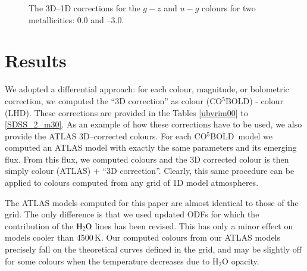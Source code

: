 \documentclass[]{aa}
\newcommand{\cobold}{{\sf CO$^5$BOLD}}
\renewcommand{\lhd}{{\sf LHD}}
\begin{document}
\begin{figure*}
\centering
{}
\caption{
The 3D--1D  corrections for  the $g-z$ and $u-g$ colours for
two metallicities: 0.0 and --3.0.
\label{coldiff}}

\end{figure*}


\section{Results}

We adopted a differential approach: for each colour, magnitude, or
bolometric correction, we computed the ``3D correction'' as
colour (\cobold ) - colour (\lhd ). These corrections
are provided in the Tables \ref{ubvrim00} to  \ref{SDSS_2_m30}. 
As an example of how these corrections have to be used, we also provide
the ATLAS  3D--corrected colours. 
For each \cobold\ model we computed an ATLAS model
with exactly the same parameters and its emerging flux. 
From this flux, we computed colours and  the 3D corrected colour
is then simply colour (ATLAS) + ``3D correction''.
Clearly, this same procedure can be applied to colours
computed from any grid of 1D model atmospheres.

The ATLAS models computed for this paper are almost identical
to those of the \citet{CK03} grid. The only difference is that 
we used updated ODFs for which the
contribution of the $\rm H_2 O$ lines has been revised. 
This has only a minor effect on models cooler
than 4500\,K. 
 Our computed colours from our ATLAS models 
precisely fall on the theoretical curves defined in the \citet{CK03} 
grid, and may be slightly off for some colours when the temperature decreases
due to H$_2$O opacity.
\end{document}
